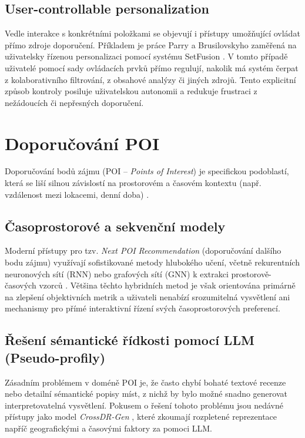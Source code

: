 \subsection{User-controllable personalization}
Vedle interakce s konkrétními položkami se objevují i přístupy umožňující ovládat přímo zdroje doporučení. Příkladem je práce Parry a Brusilovskyho zaměřená na uživatelsky řízenou personalizaci pomocí systému SetFusion \cite{ParraBrusilovsky2015}. V tomto případě uživatelé pomocí sady ovládacích prvků přímo regulují, nakolik má systém čerpat z kolaborativního filtrování, z obsahové analýzy či jiných zdrojů. Tento explicitní způsob kontroly posiluje uživatelskou autonomii a redukuje frustraci z nežádoucích či nepřesných doporučení.
\section{Doporučování POI}
\label{sec:related_poi}

Doporučování bodů zájmu (POI -- \textit{Points of Interest}) je specifickou podoblastí, která se liší silnou závislostí na prostorovém a časovém kontextu (např. vzdálenost mezi lokacemi, denní doba) \cite{Zeng2025}. 

\subsection{Časoprostorové a sekvenční modely}
Moderní přístupy pro tzv. \textit{Next POI Recommendation} (doporučování dalšího bodu zájmu) využívají sofistikované metody hlubokého učení, včetně rekurentních neuronových sítí (RNN) nebo grafových sítí (GNN) k extrakci prostorově-časových vzorců \cite{Zeng2025}. Většina těchto hybridních metod je však orientována primárně na zlepšení objektivních metrik a uživateli nenabízí srozumitelná vysvětlení ani mechanismy pro přímé interaktivní řízení svých časoprostorových preferencí.

\subsection{Řešení sémantické řídkosti pomocí LLM (Pseudo-profily)}
Zásadním problémem v doméně POI je, že často chybí bohaté textové recenze nebo detailní sémantické popisy míst, z nichž by bylo možné snadno generovat interpretovatelná vysvětlení. Pokusem o řešení tohoto problému jsou nedávné přístupy jako model \textit{CrossDR-Gen} \cite{Zeng2025}, které zkoumají rozpletené reprezentace napříč geografickými a časovými faktory za pomoci LLM. 

